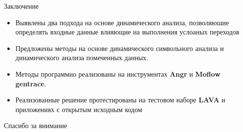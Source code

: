 \documentclass[10pt]{beamer}
\begin{document}
\begin{frame}{Заключение}

\begin{itemize}
\item Выявлены два подхода на основе динамического анализа, позволяюшие определять входные данные влияющие на выполнения услоаных переходов
\item Предложены методы на основе динамического символьного анализа и динамического анализа помеченных данных.
\item Методы программно реализованы на инструментах \textbf{Angr} и \textbf{Moflow gentrace}.
\item Реализованные решение протестированы на тестовом наборе \textbf{LAVA} и приложениях с открытым исходным кодом
\end{itemize}


\end{frame}

\begin{frame}[standout] \vfill Спасибо за внимание \vfill \end{frame}

\end{document}
